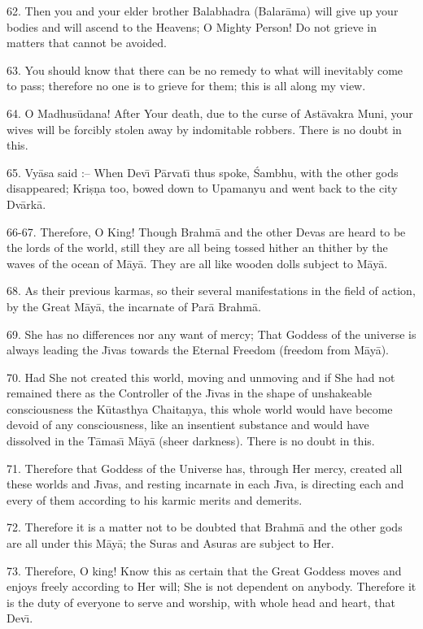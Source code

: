 62. Then you and your elder brother Balabhadra (Balar\=ama) will give up your bodies and will ascend to the Heavens; O Mighty Person! Do not grieve in matters that cannot be avoided.

63. You should know that there can be no remedy to what will inevitably come to pass; therefore no one is to grieve for them; this is all along my view.

64. O Madhus\=udana! After Your death, due to the curse of Ast\=avakra Muni, your wives will be forcibly stolen away by indomitable robbers. There is no doubt in this.

65. Vy\=asa said :-- When Dev\={\i} P\=arvat\={\i} thus spoke, \'Sambhu, with the other gods disappeared; Kri\d{s}\d{n}a too, bowed down to Upamanyu and went back to the city Dv\=ark\=a.

66-67. Therefore, O King! Though Brahm\=a and the other Devas are heard to be the lords of the world, still they are all being tossed hither an thither by the waves of the ocean of M\=ay\=a. They are all like wooden dolls subject to M\=ay\=a.

68. As their previous karmas, so their several manifestations in the field of action, by the Great M\=ay\=a, the incarnate of Par\=a Brahm\=a.

69. She has no differences nor any want of mercy; That Goddess of the universe is always leading the J\={\i}vas towards the Eternal Freedom (freedom from M\=ay\=a).

70. Had She not created this world, moving and unmoving and if She had not remained there as the Controller of the J\={\i}vas in the shape of unshakeable consciousness the K\=utasthya Chaita\d{n}ya, this whole world would have become devoid of any consciousness, like an insentient substance and would have dissolved in the T\=amas\={\i} M\=ay\=a (sheer darkness). There is no doubt in this.

71. Therefore that Goddess of the Universe has, through Her mercy, created all these worlds and J\={\i}vas, and resting incarnate in each J\={\i}va, is directing each and every of them according to his karmic merits and demerits.

72. Therefore it is a matter not to be doubted that Brahm\=a and the other gods are all under this M\=ay\=a; the Suras and Asuras are subject to Her.

73. Therefore, O king! Know this as certain that the Great Goddess moves and enjoys freely according to Her will; She is not dependent on anybody. Therefore it is the duty of everyone to serve and worship, with whole head and heart, that Dev\={\i}.

